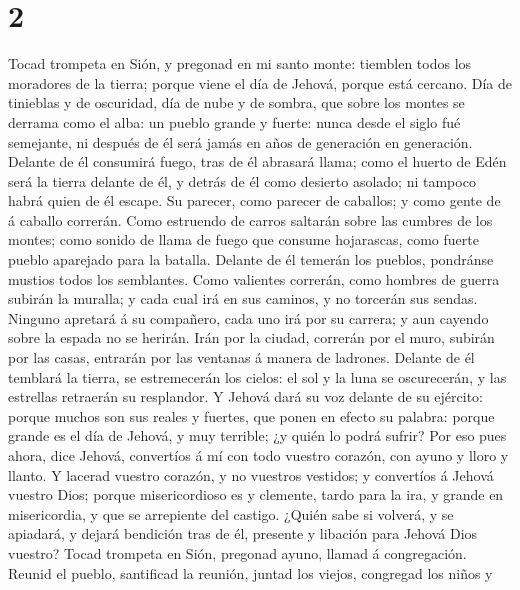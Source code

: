 \hypertarget{section-1}{%
\section{2}\label{section-1}}

 Tocad trompeta en Sión, y pregonad en mi santo monte:
tiemblen todos los moradores de la tierra; porque viene el día de
Jehová, porque está cercano.  Día de tinieblas y de
oscuridad, día de nube y de sombra, que sobre los montes se derrama como
el alba: un pueblo grande y fuerte: nunca desde el siglo fué semejante,
ni después de él será jamás en años de generación en generación.
 Delante de él consumirá fuego, tras de él abrasará llama;
como el huerto de Edén será la tierra delante de él, y detrás de él como
desierto asolado; ni tampoco habrá quien de él escape.  Su
parecer, como parecer de caballos; y como gente de á caballo correrán.
 Como estruendo de carros saltarán sobre las cumbres de
los montes; como sonido de llama de fuego que consume hojarascas, como
fuerte pueblo aparejado para la batalla.  Delante de él
temerán los pueblos, pondránse mustios todos los semblantes.
 Como valientes correrán, como hombres de guerra subirán
la muralla; y cada cual irá en sus caminos, y no torcerán sus sendas.
 Ninguno apretará á su compañero, cada uno irá por su
carrera; y aun cayendo sobre la espada no se herirán. 
Irán por la ciudad, correrán por el muro, subirán por las casas,
entrarán por las ventanas á manera de ladrones.  Delante
de él temblará la tierra, se estremecerán los cielos: el sol y la luna
se oscurecerán, y las estrellas retraerán su resplandor. 
Y Jehová dará su voz delante de su ejército: porque muchos son sus
reales y fuertes, que ponen en efecto su palabra: porque grande es el
día de Jehová, y muy terrible; ¿y quién lo podrá sufrir? 
Por eso pues ahora, dice Jehová, convertíos á mí con todo vuestro
corazón, con ayuno y lloro y llanto.  Y lacerad vuestro
corazón, y no vuestros vestidos; y convertíos á Jehová vuestro Dios;
porque misericordioso es y clemente, tardo para la ira, y grande en
misericordia, y que se arrepiente del castigo.  ¿Quién
sabe si volverá, y se apiadará, y dejará bendición tras de él, presente
y libación para Jehová Dios vuestro?  Tocad trompeta en
Sión, pregonad ayuno, llamad á congregación.  Reunid el
pueblo, santificad la reunión, juntad los viejos, congregad los niños y
